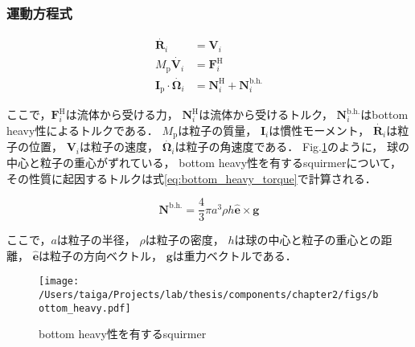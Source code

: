 \subsubsection{運動方程式}
\label{sec:equation_of_motion}
    \begin{align}
        \dot{\boldsymbol{R}_i} &= \boldsymbol{V}_i \\
        M_\mathrm{p} \dot{\boldsymbol{V}_i} &= \boldsymbol{F}^\mathrm{H}_i \\
        \boldsymbol{I}_\mathrm{p} \cdot \dot{\boldsymbol{\Omega}_i} &=
            \boldsymbol{N}^\mathrm{H}_i + \boldsymbol{N}^\mathrm{b.h.}_i
    \end{align}

ここで，$\boldsymbol{F}^\mathrm{H}_i$は流体から受ける力，
$\boldsymbol{N}^\mathrm{H}_i$は流体から受けるトルク，
$\boldsymbol{N}^\mathrm{b.h.}_i$はbottom heavy性によるトルクである．
$M_\mathrm{p}$は粒子の質量，
$\boldsymbol{I}_i$は慣性モーメント，
$\dot{\boldsymbol{R}_i}$は粒子の位置，
$\boldsymbol{V}_i$は粒子の速度，
$\dot{\boldsymbol{\Omega}_i}$は粒子の角速度である．
Fig.\ref{fig:bottom_heaviness}のように，
球の中心と粒子の重心がずれている，
bottom heavy性を有するsquirmerについて，
その性質に起因するトルクは式\eqref{eq:bottom_heavy_torque}で計算される\cite{dilute_squirmer}．

    \begin{equation}
        \boldsymbol{N}^\mathrm{b.h.} = \frac{4}{3} \pi a^3 \rho h \boldsymbol{\hat{e}} \times \boldsymbol{g}
        \label{eq:bottom_heavy_torque}
    \end{equation}

\noindent
ここで，$a$は粒子の半径，
$\rho$は粒子の密度，
$h$は球の中心と粒子の重心との距離，
$\boldsymbol{\hat{e}}$は粒子の方向ベクトル，
$\boldsymbol{g}$は重力ベクトルである．

    \begin{figure}[htbp]
        \centering
        \texttt{[image: /Users/taiga/Projects/lab/thesis/components/chapter2/figs/bottom\_heavy.pdf]}
        \caption{bottom heavy性を有するsquirmer}
        \label{fig:bottom_heaviness}
    \end{figure}
